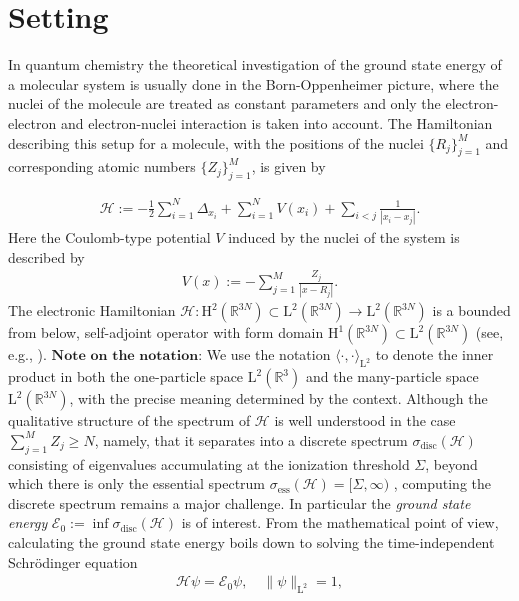 \documentclass[reqno]{amsart}
\begin{document}
\section{Setting}\label{sec:setting}
In quantum chemistry the theoretical investigation of the ground state energy of a molecular system is usually done in the Born-Oppenheimer picture, where the nuclei of the molecule are treated as constant parameters and only the electron-electron and electron-nuclei interaction is taken into account. The Hamiltonian describing this setup for a molecule, with the positions of the nuclei $\lbrace R_j\rbrace_{j=1}^M $ and corresponding atomic numbers $\lbrace Z_{j}\rbrace_{j=1}^M$, is given by 

\begin{align}\label{Hamil}
    \mathcal{H}:=-\frac{1}{2}\sum^{N}_{i=1}\Delta_{x_i}+\sum^N_{i=1}V(x_i)+\sum_{i<j}\frac{1}{|x_i-x_j|}.
\end{align}
Here the Coulomb-type potential $V$ induced by the nuclei of the system is described by
\begin{align}\label{nuclei_elec_pot}
    V(x):= -\sum^{M}_{j=1}\frac{Z_j}{|x-R_j|}.
\end{align}
The electronic Hamiltonian $\mathcal{H}:\mathrm{H}^2(\mathbb{R}^{3N})\subset \mathrm{L}^2(\mathbb{R}^{3N}) \longrightarrow \mathrm{L}^2(\mathbb{R}^{3N}) $ is a bounded from below, self-adjoint operator with form domain $\mathrm{H}^1(\mathbb{R}^{3N})\subset \mathrm{L}^2(\mathbb{R}^{3N})$ (see, e.g., \cite{Kato1951FundamentalPO}). $\textbf{Note on the notation:}$ We use the notation $\langle \cdot,\cdot \rangle_{\mathrm{L}^2}$ to denote the inner product in both the one-particle space $\mathrm{L}^2(\mathbb{R}^3)$ and the many-particle space $\mathrm{L}^2(\mathbb{R}^{3N})$, with the precise meaning determined by the context. Although the qualitative structure of the spectrum of $\mathcal{H}$ is well understood in the case 
$\sum_{j=1}^M Z_j\ge N$, namely, that it separates into a discrete spectrum $\sigma_{\text{disc}}(\mathcal{H})$ consisting of eigenvalues accumulating at the ionization threshold $\Sigma$, beyond which there is only the essential spectrum $\sigma_{\text{ess}}(\mathcal{H})=[\Sigma, \infty)$ \cite{Hunz}, computing the discrete spectrum remains a major challenge. In particular the \textit{ground state energy} $\mathcal{E}_0:= \inf\sigma_{\text{disc}}(\mathcal{H})$ is of interest. From the mathematical point of view, calculating the ground state energy boils down to solving the time-independent Schrödinger equation
\begin{align}\label{tischrödi}
    \mathcal{H}\psi=\mathcal{E}_0\psi,\quad \|\psi\|_{\mathrm{L}^2}=1,
\end{align}
\end{document}

